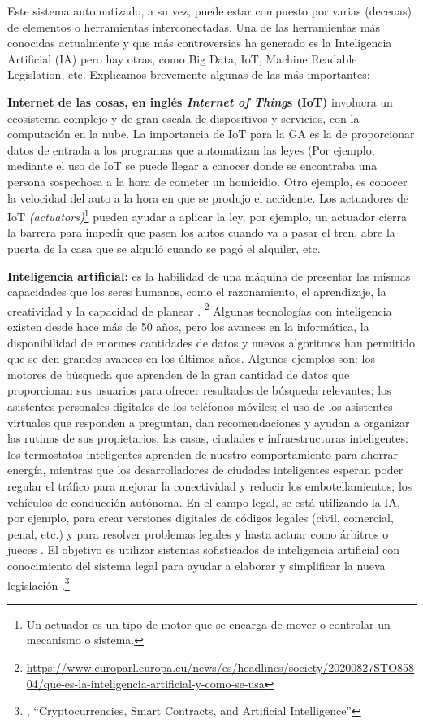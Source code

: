 \documentclass[12pt]{report} %
\begin{document}
Este sistema automatizado, a su vez, puede estar compuesto por varias (decenas) de elementos o herramientas interconectadas. Una de las herramientas más conocidas actualmente y que más controversias ha generado es la Inteligencia Artificial (IA) pero hay otras, como Big Data, IoT, Machine Readable Legislation, etc. Explicamos brevemente algunas de las más importantes:

\textbf{Internet de las cosas, en inglés \textit{Internet of Thing}s (IoT)} involucra un ecosistema complejo y de gran escala de dispositivos y servicios, con la computación en la nube. La importancia de IoT para la GA es la de proporcionar datos de entrada a los programas que automatizan las leyes (Por ejemplo, mediante el uso de IoT se puede llegar a conocer donde se encontraba una persona sospechosa a la hora de cometer un homicidio. Otro ejemplo, es conocer la velocidad del auto a la hora en que se produjo el accidente. Los actuadores de IoT \textit{(actuators)}\footnote{Un actuador es un tipo de motor que se encarga de mover o controlar un mecanismo o sistema.}  pueden ayudar a aplicar la ley, por ejemplo, un actuador cierra la barrera para impedir que pasen los autos cuando va a pasar el tren, abre la puerta de la casa que se alquiló cuando se pagó el alquiler, etc.

\textbf{Inteligencia artificial:} es la habilidad de una máquina de presentar las mismas capacidades que los seres humanos, como el razonamiento, el aprendizaje, la creatividad y la capacidad de planear . \footnote{\url{https://www.europarl.europa.eu/news/es/headlines/society/20200827STO85804/que-es-la-inteligencia-artificial-y-como-se-usa}} Algunas tecnologías con inteligencia existen desde hace más de 50 años, pero los avances en la informática, la disponibilidad de enormes cantidades de datos y nuevos algoritmos han permitido que se den grandes avances en los últimos años. Algunos ejemplos son: los motores de búsqueda que aprenden de la gran cantidad de datos que proporcionan sus usuarios para ofrecer resultados de búsqueda relevantes; los asistentes personales digitales de los teléfonos móviles; el uso de los asistentes virtuales que responden a preguntan, dan recomendaciones y ayudan a organizar las rutinas de sus propietarios; las casas, ciudades e infraestructuras inteligentes: los termostatos inteligentes aprenden de nuestro comportamiento para ahorrar energía, mientras que los desarrolladores de ciudades inteligentes esperan poder regular el tráfico para mejorar la conectividad y reducir los embotellamientos; los vehículos de conducción autónoma. En el campo legal, se está utilizando la IA, por ejemplo, para crear versiones digitales de códigos legales (civil, comercial, penal, etc.) y para resolver problemas legales y hasta actuar como árbitros o jueces . El objetivo es utilizar sistemas sofisticados de inteligencia artificial con conocimiento del sistema legal para ayudar a elaborar y simplificar la nueva legislación .\footnote{\cite{Omohundro2014}, “Cryptocurrencies, Smart Contracts, and Artificial Intelligence”}
\end{document}
